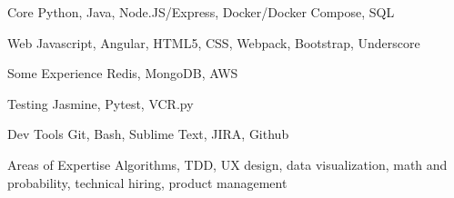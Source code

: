 

\begin{cvskills}

  \cvskill
    {Core}
    {Python, Java, Node.JS/Express, Docker/Docker Compose, SQL}

  \cvskill
    {Web}
    {Javascript, Angular, HTML5, CSS, Webpack, Bootstrap, Underscore}

  \cvskill
    {Some Experience}
    {Redis, MongoDB, AWS}

  \cvskill
    {Testing}
    {Jasmine, Pytest, VCR.py}

  \cvskill
    {Dev Tools}
    {Git, Bash, Sublime Text, JIRA, Github}

  \cvskill
    {Areas of Expertise}
    {Algorithms, TDD, UX design, data visualization, math and probability, technical hiring, product management}

\end{cvskills}
